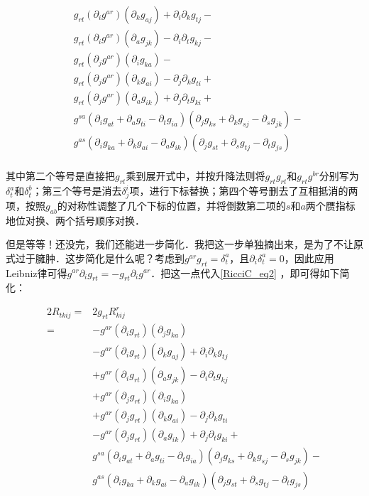 \begin{equation}
\begin{aligned}
&g_{rt}(\partial_ig^{ar})(\partial_kg_{aj})+\partial_i\partial_kg_{tj}-\\
&g_{rt}(\partial_ig^{ar})(\partial_ag_{jk})-\partial_i\partial_tg_{kj}-\\%
&g_{rt}(\partial_jg^{ar})(\partial_ig_{ka})-\\
&g_{rt}(\partial_jg^{ar})(\partial_kg_{ai})-\partial_j\partial_kg_{ti}+\\
&g_{rt}(\partial_jg^{ar})(\partial_ag_{ik})+\partial_j\partial_tg_{ki}+\\%
&g^{sa}(\partial_ig_{at}+\partial_ag_{ti}-\partial_tg_{ia})(\partial_jg_{ks}+\partial_kg_{sj}-\partial_sg_{jk})-\\
&g^{as}(\partial_ig_{ka}+\partial_kg_{ai}-\partial_ag_{ik})(\partial_jg_{st}+\partial_sg_{tj}-\partial_tg_{js})\\
\end{aligned}
\end{equation}

其中第二个等号是直接把$g_{rt}$乘到展开式中，并按升降法则将$g_{rt}g_{rt}$和$g_{rt}g^{br}$分别写为$\delta^a_t$和$\delta^b_t$；第三个等号是消去$\delta^i_j$项，进行下标替换；第四个等号删去了互相抵消的两项，按照$g_{ab}$的对称性调整了几个下标的位置，并将倒数第二项的$s$和$a$两个赝指标地位对换、两个括号顺序对换．

但是等等！还没完，我们还能进一步简化．我把这一步单独摘出来，是为了不让原式过于臃肿．这步简化是什么呢？考虑到$g^{ar}g_{rt}=\delta^a_t$，且$\partial_i\delta^a_t=0$，因此应用Leibniz律可得$g^{ar}\partial_ig_{rt}=-g_{rt}\partial_ig^{ar}$．把这一点代入\autoref{RicciC_eq2} ，即可得如下简化：

\begin{equation}\label{RicciC_eq3}
\begin{aligned}
2R_{tkij}=&2g_{rt}R^r_{kij}\\
=&-g^{ar}(\partial_ig_{rt})(\partial_jg_{ka})\\
&-g^{ar}(\partial_ig_{rt})(\partial_kg_{aj})+\partial_i\partial_kg_{tj}\\
&+g^{ar}(\partial_ig_{rt})(\partial_ag_{jk})-\partial_i\partial_tg_{kj}\\%
&+g^{ar}(\partial_jg_{rt})(\partial_ig_{ka})\\
&+g^{ar}(\partial_jg_{rt})(\partial_kg_{ai})-\partial_j\partial_kg_{ti}\\
&-g^{ar}(\partial_jg_{rt})(\partial_ag_{ik})+\partial_j\partial_tg_{ki}+\\%
&g^{sa}(\partial_ig_{at}+\partial_ag_{ti}-\partial_tg_{ia})(\partial_jg_{ks}+\partial_kg_{sj}-\partial_sg_{jk})-\\
&g^{as}(\partial_ig_{ka}+\partial_kg_{ai}-\partial_ag_{ik})(\partial_jg_{st}+\partial_sg_{tj}-\partial_tg_{js})\\
\end{aligned}
\end{equation}

